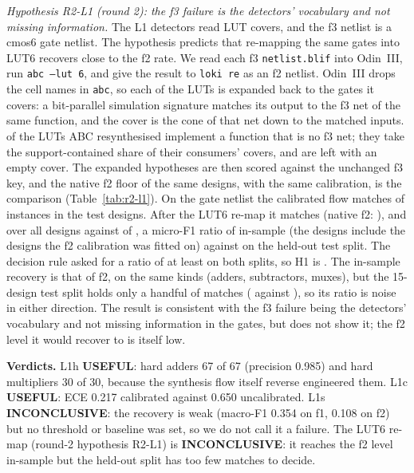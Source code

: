 \documentclass[conference]{IEEEtran}
\newcommand{\verdict}[1]{\textbf{\textsc{#1}}}
\newcommand{\hev}[1]{\par\smallskip\noindent\textbf{#1}}
\newcommand{\code}[1]{\texttt{#1}}
\begin{document}
\emph{Hypothesis R2-L1 (round 2): the f3 failure is the detectors' vocabulary and not missing information.} The L1 detectors read LUT covers,
and the f3 netlist is a cmos6 gate netlist. The hypothesis predicts that re-mapping the same gates into LUT6 recovers
close to the f2 rate. We read each f3 \code{netlist.blif} into Odin~III, run
\code{abc --lut 6}, and give the result to \code{loki re} as an f2 netlist. Odin~III drops
the cell names in \code{abc}, so each of the \rtLoneLuts{} LUTs is expanded back to the
gates it covers: a bit-parallel simulation signature matches its output to the f3 net of the
same function, and the cover is the cone of that net down to the matched inputs.
\rtLoneNoMatchFrac{} of the LUTs ABC resynthesised implement a function that is no f3 net;
they take the support-contained share of their consumers' covers, and \rtLoneEmpty{} are left
with an empty cover. The expanded hypotheses are then scored against the unchanged f3 key,
and the native f2 floor of the same \rtLoneDesigns{} designs, with the same calibration, is the
comparison (Table~\ref{tab:r2-l1}). On the gate netlist the calibrated flow matches
\rtLoneGateMatched{} of \rtLoneGateGt{} instances in the \rtLoneTestDesigns{} test designs. After the LUT6
re-map it matches \rtLoneLutMatchedTest{} (native f2: \rtLoneNativeMatchedTest{}), and over
all \rtLoneDesigns{} designs \rtLoneLutMatchedAll{} against \rtLoneNativeMatchedAll{} of \rtLoneGtAll{},
a micro-F1 ratio of \rtLoneAllRatio{} in-sample (the \rtLoneDesigns{} designs include the designs the f2
calibration was fitted on) against \rtLoneTestRatio{} on the held-out test split. The decision rule asked for a ratio of at least \rtLoneThr{} on both splits, so H1 is \rtLoneStatus{}. The in-sample recovery is
that of f2, on the same kinds (adders, subtractors, muxes), but the 15-design test split holds
only a handful of matches (\rtLoneLutMatchedTest{} against \rtLoneNativeMatchedTest{}), so its
ratio is noise in either direction. The result is consistent with the f3 failure being the
detectors' vocabulary and not missing information in the gates, but does not show it; the f2
level it would recover to is itself low.

\hev{Verdicts.} L1h \verdict{USEFUL}: hard adders 67 of 67 (precision 0.985) and hard multipliers 30 of 30,
because the synthesis flow itself reverse engineered them. L1c \verdict{USEFUL}: ECE 0.217 calibrated against
0.650 uncalibrated. L1s \verdict{INCONCLUSIVE}: the recovery is weak (macro-F1 0.354 on f1, 0.108 on f2) but no
threshold or baseline was set, so we do not call it a failure. The LUT6 re-map (round-2 hypothesis R2-L1) is
\verdict{INCONCLUSIVE}: it reaches the f2 level in-sample but the held-out split has too few matches to decide.
\end{document}
